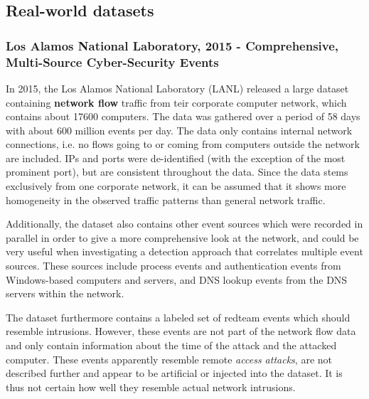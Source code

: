 



\subsection{Real-world datasets}

\subsubsection*{Los Alamos National Laboratory, 2015 - Comprehensive, Multi-Source Cyber-Security Events \cite{akent-2015-enterprise-data}\cite{kent-2015-cyberdata1}}

In 2015, the Los Alamos National Laboratory (LANL) released a large dataset containing \textbf{network flow} traffic from teir corporate computer network, which contains about 17600 computers. The data was gathered over a period of 58 days with about 600 million events per day. The data only contains internal network connections, i.e. no flows going to or coming from computers outside the network are included. IPs and ports were de-identified (with the exception of the most prominent port), but are consistent throughout the data. Since the data stems exclusively from one corporate network, it can be assumed that it shows more homogeneity in the observed traffic patterns than  general network traffic.

Additionally, the dataset also contains other event sources which were recorded in parallel in order to give a more comprehensive look at the network, and could be very useful when investigating a detection approach that correlates multiple event sources. These sources include process events and authentication events from Windows-based computers and servers, and DNS lookup events from the DNS servers within the network. 

The dataset furthermore contains a labeled set of redteam events which should resemble intrusions. However, these events are not part of the network flow data and only contain information about the time of the attack and the attacked computer. These events apparently resemble remote \textit{access attacks}, are not described further and appear to be artificial or injected into the dataset. It is thus not certain how well they resemble actual network intrusions.


